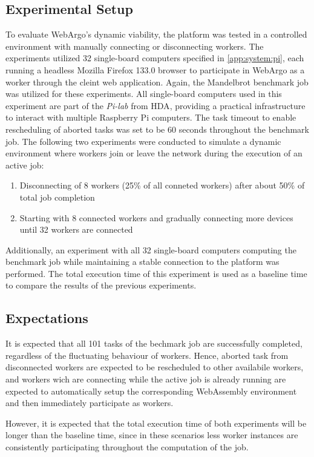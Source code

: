 \subsection{Experimental Setup}
To evaluate WebArgo's dynamic viability, the platform was tested in a controlled environment with manually connecting or disconnecting workers. The experiments utilized 32 single-board computers specified in \autoref{app:system:pi}, each running a headless Mozilla Firefox 133.0 \cite{background:firefox2} browser to participate in WebArgo as a worker through the cleint web application. Again, the Mandelbrot benchmark job was utilized for these experiments. All single-board computers used in this experiment are part of the \emph{Pi-lab} from \ac{HDA}, providing a practical infrastructure to interact with multiple Raspberry Pi computers. The task timeout to enable rescheduling of aborted tasks was set to be 60 seconds throughout the benchmark job. The following two experiments were conducted to simulate a dynamic environment where workers join or leave the network during the execution of an active job:
\begin{enumerate}
    \item Disconnecting of 8 workers (25\% of all conneted workers) after about 50\% of total job completion 
    \item Starting with 8 connected workers and gradually connecting more devices until 32 workers are connected
\end{enumerate}
Additionally, an experiment with all 32 single-board computers computing the benchmark job while maintaining a stable connection to the platform was performed. The total execution time of this experiment is used as a baseline time to compare the results of the previous experiments.

\subsection{Expectations}
It is expected that all 101 tasks of the bechmark job are successfully completed, regardless of the fluctuating behaviour of workers. Hence, aborted task from disconnected workers are expected to be rescheduled to other availabile workers, and workers wich are connecting while the active job is already running are expected to automatically setup the corresponding WebAssembly environment and then immediately participate as workers.

However, it is expected that the total execution time of both experiments will be longer than the baseline time, since in these scenarios less worker instances are consistently participating throughout the computation of the job. 

